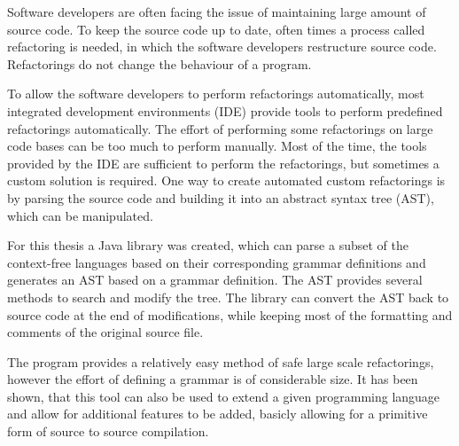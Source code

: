 
Software developers are often facing the issue of maintaining large amount of source code. 
To keep the source code up to date, often times a process called refactoring is needed, in which the software developers restructure source code.
Refactorings do not change the behaviour of a program.

To allow the software developers to perform refactorings automatically, most integrated development environments (IDE) provide tools to 
perform predefined refactorings automatically. 
The effort of performing some refactorings on large code bases can be too much to perform manually. 
Most of the time, the tools provided by the IDE are sufficient to perform the refactorings, but sometimes a custom solution is required.
One way to create automated custom refactorings is by parsing the source code and building it into an abstract syntax tree (AST), 
which can be manipulated.


For this thesis a Java library was created, which can parse a subset of the context-free languages based on their corresponding grammar definitions 
and generates an AST based on a grammar definition. The AST provides several methods to search and modify the tree. The library can convert the AST
back to source code at the end of modifications, while keeping most of the formatting and comments of the original source file.


The program provides a relatively easy method of safe large scale refactorings, however the effort of defining a grammar is of considerable size.
It has been shown, that this tool can also be used to extend a given programming language and allow for additional features to be added, 
basicly allowing for a primitive form of source to source compilation. 
